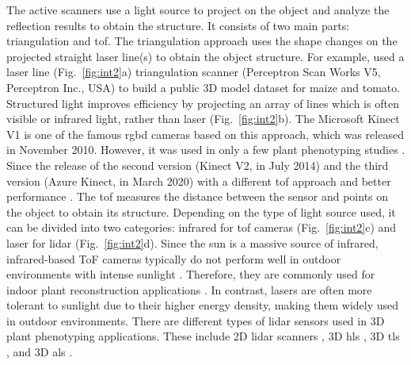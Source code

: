 

The active scanners use a light source to project on the object and analyze the reflection results to obtain the structure. It consists of two main parts: triangulation and \gls{tof}. The triangulation approach uses the shape changes on the projected straight laser line(s) to obtain the object structure. For example, \citet[Figure~3]{schunck_pheno4d_2021} used a laser line (Fig.~\ref{fig:int2}a) triangulation scanner (Perceptron Scan Works V5, Perceptron Inc., USA) to build a public 3D model dataset for maize and tomato. Structured light improves efficiency by projecting an array of lines which is often visible or infrared light, rather than laser (Fig.~\ref{fig:int2}b). The Microsoft Kinect V1 is one of the famous \gls{rgbd} cameras based on this approach, which was released in November 2010. However, it was used in only a few plant phenotyping studies \citep{nguyen_structured_2015}. Since the release of the second version (Kinect V2, in July 2014) and the third version (Azure Kinect, in March 2020) with a different \gls{tof} approach and better performance \citep{tolgyessy_evaluation_2021, lachat_assessment_2015}. 
The \acrfull{tof} measures the distance between the sensor and points on the object to obtain its structure. Depending on the type of light source used, it can be divided into two categories: infrared for \gls{tof} cameras (Fig.~\ref{fig:int2}c) and laser for \gls{lidar} (Fig.~\ref{fig:int2}d). Since the sun is a massive source of infrared, infrared-based ToF cameras typically do not perform well in outdoor environments with intense sunlight \citep{tolgyessy_evaluation_2021}. Therefore, they are commonly used for indoor plant reconstruction applications \citep{martinez_low_2019, zhang_3d_2020, xu_global_2023}. In contrast, lasers are often more tolerant to sunlight due to their higher energy density, making them widely used in outdoor environments. There are different types of \gls{lidar} sensors used in 3D plant phenotyping applications. These include 2D \gls{lidar} scanners \citep{garrido_3d_2015}, 3D \gls{hls} \citep{ma_calculation_2019}, 3D \gls{tls} \citep{wu_accurate_2019, su_estimation_2018, qiu_field-based_2019}, and 3D \gls{als} \citep{ten_biomass_2019, nguyen_uav_2023}.

